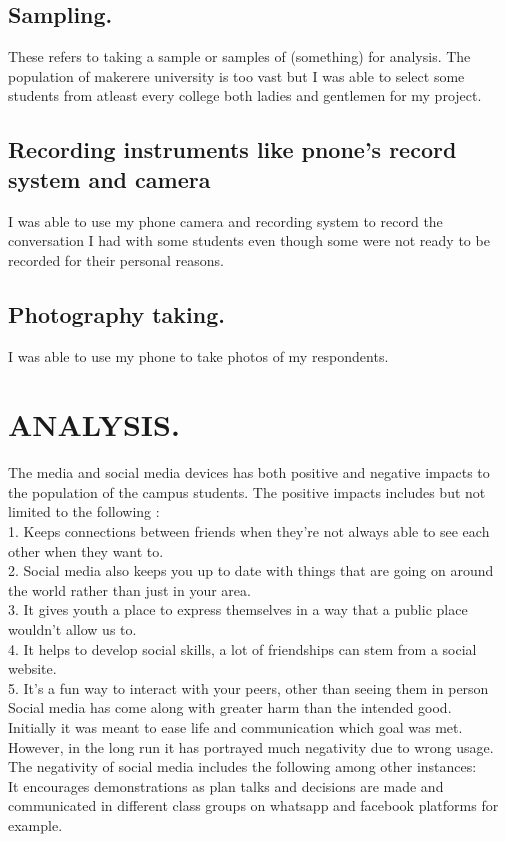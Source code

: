 \documentclass[12pt,A4paper]{article}
\begin{document}
\subsection{Sampling.}
These refers to taking a sample or samples of (something) for analysis. The population of makerere university is too vast but I was able to select some students from atleast every college both ladies and gentlemen for my project.

\subsection{Recording instruments like pnone’s record system and camera}
I was able to use my phone camera and recording system to record the conversation I had with some students even though some were not ready to be recorded for their personal reasons.


\subsection{Photography taking.}
I was able to use my phone to take photos of my respondents.

\section{ANALYSIS.}
The media and social media devices has both positive and negative impacts to the population of the campus students.
The positive impacts includes but not limited to the following :\\
1.	Keeps connections between friends when they’re not always able to see each other when they want to.\\
2.	Social media also keeps you up to date with things that are going on around the world rather than just in your area.\\
3.	It gives youth a place to express themselves in a way that a public place wouldn’t allow us to.\\
4.	It helps to develop social skills, a lot of friendships can stem from a social website.\\
5.	It’s a fun way to interact with your peers, other than seeing them in person
\\
Social media has come along with greater harm than the intended good.\\ Initially it was meant to ease life and communication which goal was met. However, in the long run it has portrayed much negativity due to wrong usage.\\
The negativity of social media includes the following among other instances:\\
It encourages demonstrations as plan talks and decisions are made and communicated in different class groups on whatsapp and facebook platforms for example.\\
\end{document}
